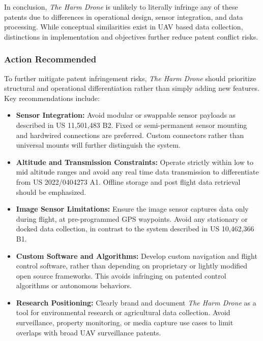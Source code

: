 \documentclass[12pt]{article}
\begin{document}
\par In conclusion, \textit{The Harm Drone} is unlikely to literally infringe any of these patents due to differences in operational design, sensor integration, and data processing. While conceptual similarities exist in UAV based data collection, distinctions in implementation and objectives further reduce patent conflict risks.

\subsubsection{Action Recommended}

\par To further mitigate patent infringement risks, \textit{The Harm Drone} should prioritize structural and operational differentiation rather than simply adding new features. Key recommendations include:

\begin{itemize}
    \item \textbf{Sensor Integration:} Avoid modular or swappable sensor payloads as described in US 11,501,483 B2. Fixed or semi-permanent sensor mounting and hardwired connections are preferred. Custom connectors rather than universal mounts will further distinguish the system.
    
    \item \textbf{Altitude and Transmission Constraints:} Operate strictly within low to mid altitude ranges and avoid any real time data transmission to differentiate from US 2022/0404273 A1. Offline storage and post flight data retrieval should be emphasized.

    \item \textbf{Image Sensor Limitations:} Ensure the image sensor captures data only during flight, at pre-programmed GPS waypoints. Avoid any stationary or docked data collection, in contrast to the system described in US 10,462,366 B1.

    \item \textbf{Custom Software and Algorithms:} Develop custom navigation and flight control software, rather than depending on proprietary or lightly modified open source frameworks. This avoids infringing on patented control algorithms or autonomous behaviors.

    \item \textbf{Research Positioning:} Clearly brand and document \textit{The Harm Drone} as a tool for environmental research or agricultural data collection. Avoid surveillance, property monitoring, or media capture use cases to limit overlaps with broad UAV surveillance patents.
\end{itemize}
\end{document}
